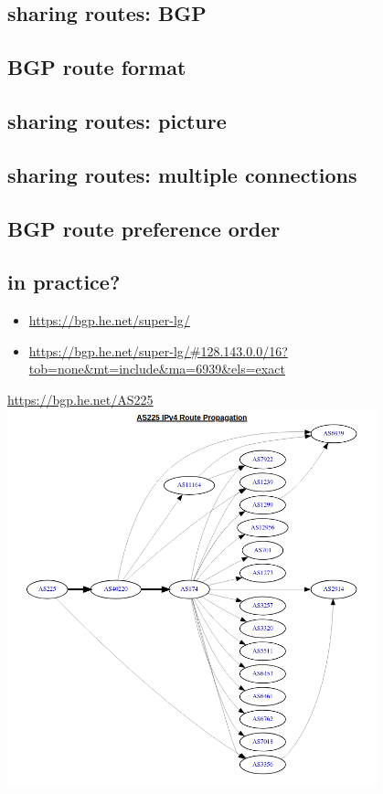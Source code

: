 \subsection{sharing routes: BGP}


\subsection{BGP route format}


\subsection{sharing routes: picture}


\subsection{sharing routes: multiple connections}


\subsection{BGP route preference order}

\subsection{in practice?}
\begin{frame}[fragile]{}
    \begin{itemize}
    \item \url{https://bgp.he.net/super-lg/}
    \item \url{https://bgp.he.net/super-lg/#128.143.0.0/16?tob=none&mt=include&ma=6939&els=exact}
    \end{itemize}
\end{frame}

\begin{frame}{}
\url{https://bgp.he.net/AS225}
\includegraphics[width=0.8\textwidth]{../routing/as225-graph}
\end{frame}

